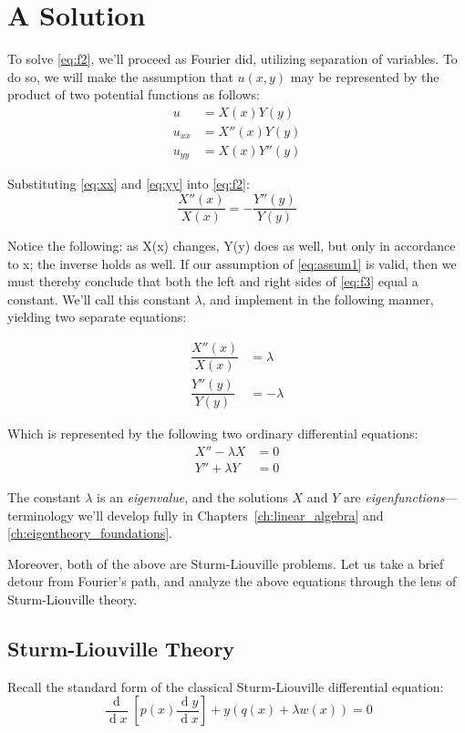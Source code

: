 \documentclass[12pt,a4paper]{report}
\DeclareMathOperator{\deriv}{d}
\theoremstyle{thms}
\theoremstyle{defns}
\begin{document}
\section{A Solution}
To solve \eqref{eq:f2}, we'll proceed as Fourier did, utilizing separation of variables. To do so, we will make the assumption that $u(x, y)$ may be represented by the product of two potential functions as follows:
\begin{align}
    u      & = X(x)Y(y)\label{eq:assum1} \\
    u_{xx} & = X''(x)Y(y)\label{eq:xx}   \\
    u_{yy} & = X(x)Y''(y)\label{eq:yy}
\end{align}

Substituting \eqref{eq:xx} and \eqref{eq:yy} into \eqref{eq:f2}:
\begin{equation}
    \dfrac{X''(x)}{X(x)} = -\dfrac{Y''(y)}{Y(y)}
    \label{eq:f3}
\end{equation}

Notice the following: as X(x) changes, Y(y) does as well, but only in accordance to x; the inverse holds as well. If our assumption of \eqref{eq:assum1} is valid, then we must thereby conclude that both the left and right sides of \eqref{eq:f3} equal a constant. We'll call this constant $\lambda$, and implement in the following manner, yielding two separate equations:

\begin{align}
    \dfrac{X''(x)}{X(x)} & = \lambda  \\
    \dfrac{Y''(y)}{Y(y)} & = -\lambda
\end{align}

Which is represented by the following two ordinary differential equations:
\begin{align}
    X'' - \lambda X & = 0 \label{eq:sturm1} \\
    Y'' + \lambda Y & = 0 \label{eq:sturm2}
\end{align}

The constant $\lambda$ is an \textit{eigenvalue}, and the solutions $X$ and $Y$ are \textit{eigenfunctions}—terminology we'll develop fully in Chapters~\ref{ch:linear_algebra} and \ref{ch:eigentheory_foundations}.

Moreover, both of the above are Sturm-Liouville problems. Let us take a brief detour from Fourier's path, and analyze the above equations through the lens of Sturm-Liouville theory.

\subsection{Sturm-Liouville Theory}
Recall the standard form of the classical Sturm-Liouville differential equation:
\begin{equation}
    \dfrac{\deriv}{\deriv{x}}[p(x) \dfrac{\deriv{y}}{\deriv{x}}] + y(q(x) + \lambda w(x)) = 0
\end{equation}
\end{document}

